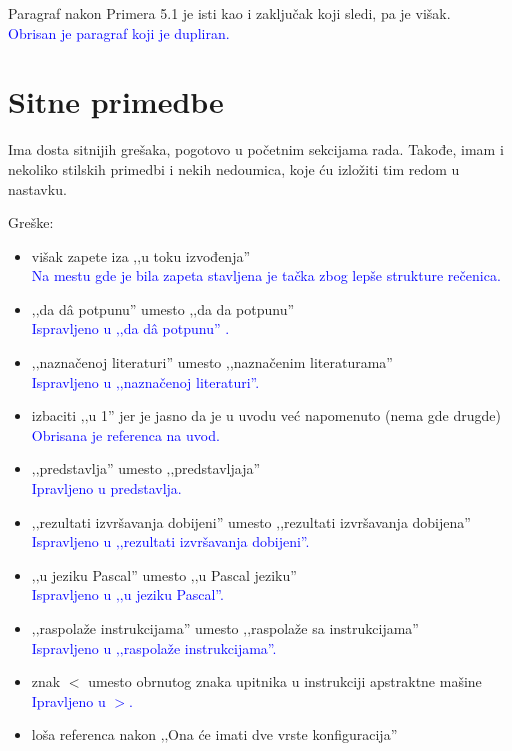 \documentclass[a4paper]{report}
\newcommand{\odgovor}[1]{\textcolor{blue}{#1}}
\begin{document}
{Paragraf nakon Primera 5.1 je isti kao i zaključak koji sledi, pa je višak.} \\
\odgovor {Obrisan je paragraf koji je dupliran. }

\section{Sitne primedbe}

{Ima dosta sitnijih grešaka, pogotovo u početnim sekcijama rada. Takođe, imam i nekoliko stilskih primedbi i nekih nedoumica, koje ću izložiti tim redom u nastavku.}

Greške:
\begin{itemize}
	\item višak zapete iza ‚‚u toku izvođenja'' \\
	\odgovor{Na mestu gde je bila zapeta stavljena je tačka zbog lepše strukture rečenica.} 
	\item ‚‚da d\^{a} potpunu'' umesto ‚‚da da potpunu''\\
	\odgovor{Ispravljeno u ‚‚da d\^{a} potpunu'' .}
	\item ‚‚naznačenoj literaturi'' umesto ‚‚naznačenim literaturama''\\
	\odgovor{Ispravljeno u ‚‚naznačenoj literaturi''.}
	\item izbaciti ‚‚u 1'' jer je jasno da je u uvodu već napomenuto (nema gde drugde)\\
	\odgovor{Obrisana je referenca na uvod.}
	\item ‚‚predstavlja'' umesto ‚‚predstavljaja''\\
	\odgovor{Ipravljeno u predstavlja.}
	\item ‚‚rezultati izvršavanja dobijeni'' umesto ‚‚rezultati izvršavanja dobijena''\\
	 \odgovor{Ispravljeno u ‚‚rezultati izvršavanja dobijeni''. }
	\item ‚‚u jeziku Pascal'' umesto ‚‚u Pascal jeziku''\\
	\odgovor{Ispravljeno u ‚‚u jeziku Pascal''.}
	\item ‚‚raspolaže instrukcijama'' umesto ‚‚raspolaže sa instrukcijama''\\
	 \odgovor{Ispravljeno u ‚‚raspolaže instrukcijama''.}
	\item znak \textit{$<$} umesto obrnutog znaka upitnika u instrukciji apstraktne mašine\\
	\odgovor{Ipravljeno u \textit{$>$}.}
	\item loša referenca nakon ‚‚Ona će imati dve vrste konfiguracija''\\

\end{itemize}
\end{document}

